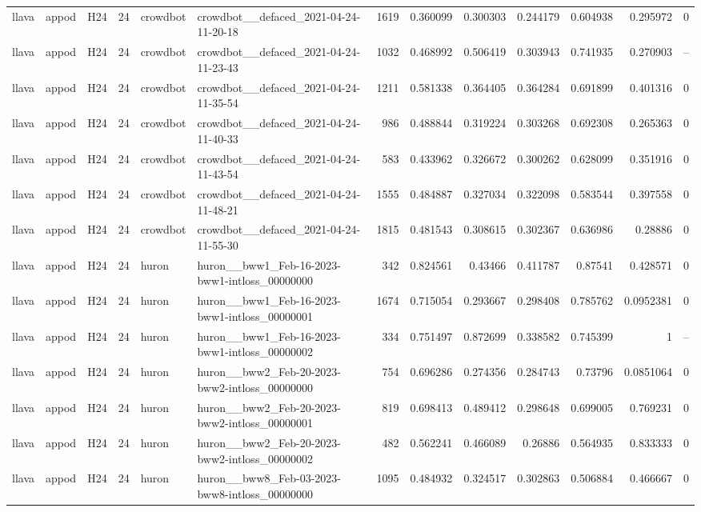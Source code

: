 \begin{longtable}{lllrllrrrrrrr}
llava & appod & H24 & 24 & crowdbot & crowdbot\_\_defaced\_2021-04-24-11-20-18 & 1619 & 0.360099 & 0.300303 & 0.244179 & 0.604938 & 0.295972 & 0 \\
llava & appod & H24 & 24 & crowdbot & crowdbot\_\_defaced\_2021-04-24-11-23-43 & 1032 & 0.468992 & 0.506419 & 0.303943 & 0.741935 & 0.270903 & -- \\
llava & appod & H24 & 24 & crowdbot & crowdbot\_\_defaced\_2021-04-24-11-35-54 & 1211 & 0.581338 & 0.364405 & 0.364284 & 0.691899 & 0.401316 & 0 \\
llava & appod & H24 & 24 & crowdbot & crowdbot\_\_defaced\_2021-04-24-11-40-33 & 986 & 0.488844 & 0.319224 & 0.303268 & 0.692308 & 0.265363 & 0 \\
llava & appod & H24 & 24 & crowdbot & crowdbot\_\_defaced\_2021-04-24-11-43-54 & 583 & 0.433962 & 0.326672 & 0.300262 & 0.628099 & 0.351916 & 0 \\
llava & appod & H24 & 24 & crowdbot & crowdbot\_\_defaced\_2021-04-24-11-48-21 & 1555 & 0.484887 & 0.327034 & 0.322098 & 0.583544 & 0.397558 & 0 \\
llava & appod & H24 & 24 & crowdbot & crowdbot\_\_defaced\_2021-04-24-11-55-30 & 1815 & 0.481543 & 0.308615 & 0.302367 & 0.636986 & 0.28886 & 0 \\
llava & appod & H24 & 24 & huron & huron\_\_bww1\_Feb-16-2023-bww1-intloss\_00000000 & 342 & 0.824561 & 0.43466 & 0.411787 & 0.87541 & 0.428571 & 0 \\
llava & appod & H24 & 24 & huron & huron\_\_bww1\_Feb-16-2023-bww1-intloss\_00000001 & 1674 & 0.715054 & 0.293667 & 0.298408 & 0.785762 & 0.0952381 & 0 \\
llava & appod & H24 & 24 & huron & huron\_\_bww1\_Feb-16-2023-bww1-intloss\_00000002 & 334 & 0.751497 & 0.872699 & 0.338582 & 0.745399 & 1 & -- \\
llava & appod & H24 & 24 & huron & huron\_\_bww2\_Feb-20-2023-bww2-intloss\_00000000 & 754 & 0.696286 & 0.274356 & 0.284743 & 0.73796 & 0.0851064 & 0 \\
llava & appod & H24 & 24 & huron & huron\_\_bww2\_Feb-20-2023-bww2-intloss\_00000001 & 819 & 0.698413 & 0.489412 & 0.298648 & 0.699005 & 0.769231 & 0 \\
llava & appod & H24 & 24 & huron & huron\_\_bww2\_Feb-20-2023-bww2-intloss\_00000002 & 482 & 0.562241 & 0.466089 & 0.26886 & 0.564935 & 0.833333 & 0 \\
llava & appod & H24 & 24 & huron & huron\_\_bww8\_Feb-03-2023-bww8-intloss\_00000000 & 1095 & 0.484932 & 0.324517 & 0.302863 & 0.506884 & 0.466667 & 0 \\

\end{longtable}
